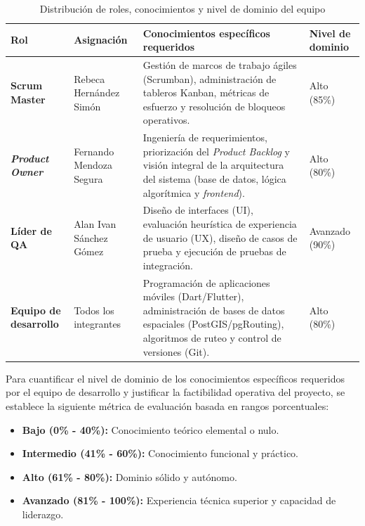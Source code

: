 \begin{table}[htbp]
\centering
\footnotesize
\caption{Distribución de roles, conocimientos y nivel de dominio del equipo}
\label{tab:roles_conocimientos}
\begin{tabular}{| >{\centering\arraybackslash}m{} | >{\centering\arraybackslash}m{} | >{\centering\arraybackslash}m{} | >{\centering\arraybackslash}m{} |}
\hline
\textbf{Rol} & \textbf{Asignación} & \textbf{Conocimientos específicos requeridos} & \textbf{Nivel de dominio} \\ \hline

\textbf{Scrum Master} & Rebeca Hernández Simón & Gestión de marcos de trabajo ágiles (Scrumban), administración de tableros Kanban, métricas de esfuerzo y resolución de bloqueos operativos. & Alto (85\%) \\ \hline

\textbf{\textit{Product Owner}} & Fernando Mendoza Segura & Ingeniería de requerimientos, priorización del \textit{Product Backlog} y visión integral de la arquitectura del sistema (base de datos, lógica algorítmica y \textit{frontend}). & Alto (80\%) \\ \hline

\textbf{Líder de QA} & Alan Ivan Sánchez Gómez & Diseño de interfaces (UI), evaluación heurística de experiencia de usuario (UX), diseño de casos de prueba y ejecución de pruebas de integración. & Avanzado (90\%) \\ \hline

\textbf{Equipo de desarrollo} & Todos los integrantes & Programación de aplicaciones móviles (Dart/Flutter), administración de bases de datos espaciales (PostGIS/pgRouting), algoritmos de ruteo y control de versiones (Git). & Alto (80\%) \\ \hline
\end{tabular}
\end{table}

Para cuantificar el nivel de dominio de los conocimientos específicos requeridos por el equipo de desarrollo y justificar la factibilidad operativa del proyecto, se establece la siguiente métrica de evaluación basada en rangos porcentuales:

\begin{itemize}
    \item \textbf{Bajo (0\% - 40\%):} Conocimiento teórico elemental o nulo. 
    \item \textbf{Intermedio (41\% - 60\%):} Conocimiento funcional y práctico. 
    \item \textbf{Alto (61\% - 80\%):} Dominio sólido y autónomo. 
    \item \textbf{Avanzado (81\% - 100\%):} Experiencia técnica superior y capacidad de liderazgo. 
\end{itemize}

